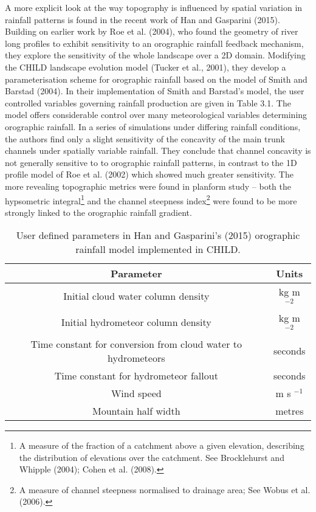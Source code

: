A more explicit look at the way topography is influenced by spatial variation in rainfall patterns is found in the recent work of Han and Gasparini (2015). Building on earlier work by Roe et al. (2004), who found the geometry of river long profiles to exhibit sensitivity  to an orographic rainfall feedback mechanism, they explore the sensitivity of the whole landscape over a 2D domain. Modifying the CHILD landscape evolution model (Tucker et al., 2001), they develop a parameterisation scheme for orographic rainfall based on the model of  Smith and Barstad (2004). In their implementation of Smith and Barstad's model, the user controlled variables governing rainfall production are given in Table 3.1. The model offers considerable control over many meteorological variables determining orographic rainfall. In a series of simulations under differing rainfall conditions, the authors find only a slight sensitivity of the concavity of the main trunk channels under spatially variable rainfall. They conclude that channel concavity is not generally sensitive to to orographic rainfall patterns, in contrast to the 1D profile model of Roe et al. (2002) which showed much greater sensitivity. The more revealing topographic metrics were found in planform study -- both the hypsometric integral\footnote{A measure of the fraction of a catchment above a given elevation, describing the distribution of elevations over the catchment. See Brocklehurst and Whipple (2004); Cohen et al. (2008).} and the channel steepness index\footnote{A measure of channel steepness normalised to drainage area; See Wobus et al. (2006).} were found to be more strongly linked to the orographic rainfall gradient. 

\label{HanParameters}
\begin{table}
\begin{tabular}{|c|c|}
\hline 
\textbf{Parameter} & \textbf{Units}  \\ 
\hline 
Initial cloud water column density & kg m \(^{-2}\) \\ 
\hline 
Initial hydrometeor column density & kg m \(^{-2}\) \\ 
\hline 
Time constant for conversion from cloud water to hydrometeors & seconds \\ 
\hline 
Time constant for hydrometeor fallout & seconds \\ 
\hline 
Wind speed & m s \(^{-1}\) \\ 
\hline 
Mountain half width & metres \\ 
\hline 
\end{tabular} 
\caption{User defined parameters in Han and Gasparini's (2015) orographic rainfall model implemented in CHILD.}
\end{table}

